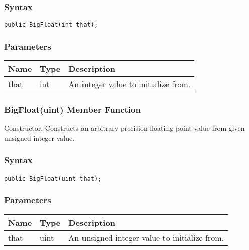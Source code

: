 \documentclass[a4paper,oneside,11.000000pt]{book}
\begin{document}
\subsubsection*{Syntax}\texttt{public BigFloat(int that);}

\subsubsection*{Parameters}
\begin{flushleft}
\begin{supertabular}[l]{lll}
\textbf{Name}
& \textbf{Type}
& \textbf{Description}
\\
\hline
that
& int
& An integer value to initialize from.

\\
\end{supertabular}

\end{flushleft}
\clearpage

\hypertarget{System.Numerics.Multiprecision.BigFloat.constructor.P.System.Numerics.Multiprecision.BigFloat.uint}{\subsubsection*{BigFloat(uint) Member Function}}
\begin{flushleft}
Constructor. Constructs an arbitrary precision floating point value from given unsigned integer value.

\end{flushleft}
\subsubsection*{Syntax}\texttt{public BigFloat(uint that);}

\subsubsection*{Parameters}
\begin{flushleft}
\begin{supertabular}[l]{lll}
\textbf{Name}
& \textbf{Type}
& \textbf{Description}
\\
\hline
that
& uint
& An unsigned integer value to initialize from.

\\
\end{supertabular}

\end{flushleft}
\clearpage
\end{document}
